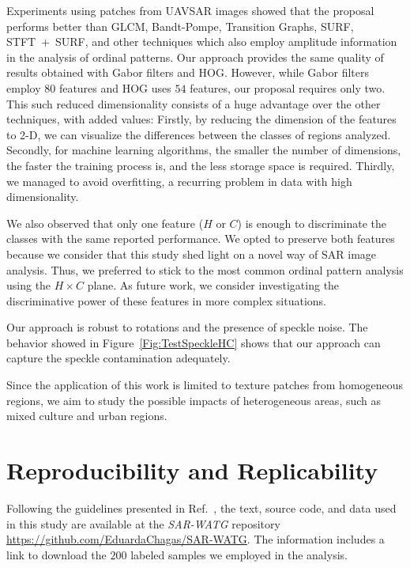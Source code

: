 Experiments using patches from UAVSAR images showed that the proposal performs better than GLCM, Bandt-Pompe, Transition Graphs, SURF, \mbox{STFT + SURF}, and other techniques which also employ amplitude information in the analysis of ordinal patterns. 
Our approach provides the same quality of results obtained with Gabor filters and HOG.
However, while Gabor filters employ $80$ features and HOG uses $54$ features, our proposal requires only two.
This such reduced dimensionality consists of a huge advantage over the other techniques, with added values:
Firstly, by reducing the dimension of the features to \mbox{2-D}, we can visualize the differences between the classes of regions analyzed.
Secondly, for machine learning algorithms, the smaller the number of dimensions, the faster the training process is, and the less storage space is required.
Thirdly, we managed to avoid overfitting, a recurring problem in data with high dimensionality.

We also observed that only one feature ($H$ or $C$) is enough to discriminate the classes with the same reported performance. We opted to preserve both features because we consider that this study shed light on a novel way of SAR image analysis. Thus, we preferred to stick to the most common ordinal pattern analysis using the $H \times C $ plane. 
As future work, we consider investigating the discriminative power of these features in more complex situations.

Our approach is robust to rotations and the presence of speckle noise. The behavior showed in Figure~\ref{Fig:TestSpeckleHC} shows that our approach can capture the speckle contamination adequately.

Since the application of this work is limited to texture patches from homogeneous regions, we aim to study the possible impacts of heterogeneous areas, such as mixed culture and urban regions.
	
\section{Reproducibility and Replicability} 

Following the guidelines presented in Ref.~\cite{ABadgingSystemforReproducibilityandReplicabilityinRemoteSensingResearch}, the text, source code, and data used in this study are available at the \textit{SAR-WATG} repository \url{https://github.com/EduardaChagas/SAR-WATG}.
The information includes a link to download the $200$ labeled samples we employed in the analysis.